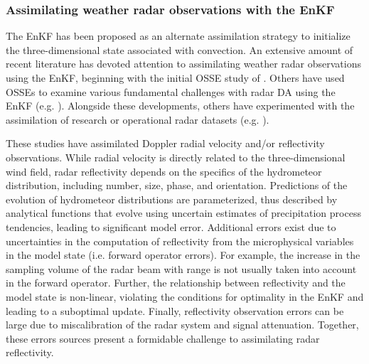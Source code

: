 \subsubsection{Assimilating weather radar observations with the EnKF}
\label{background_radarenkf}
The EnKF has been proposed as an alternate assimilation strategy to initialize the three-dimensional state associated with convection. An extensive amount of recent literature has devoted attention to assimilating weather radar observations using the EnKF, beginning with the initial OSSE study of \citet{snyderzhang03}. Others have used OSSEs to examine various fundamental challenges with radar DA using the EnKF (e.g. \citealt{zhangetal04,tongxue05,cayaetal05,xueetal06,jungetal08a,xuetal08,luxu09,thompsonetal12}). Alongside these developments, others have experimented with the assimilation of research or operational radar datasets (e.g. \citealt{dowelletal04,aksoyetal09,dowellwicker09,dowelletal11,snooketal11,dawsonetal12,jungetal12,tanamachietal13,yussoufetal13}).

These studies have assimilated Doppler radial velocity and/or reflectivity observations. While radial velocity is directly related to the three-dimensional wind field, radar reflectivity depends on the specifics of the hydrometeor distribution, including number, size, phase, and orientation. Predictions of the evolution of hydrometeor distributions are parameterized, thus described by analytical functions that evolve using uncertain estimates of precipitation process tendencies, leading to significant model error. Additional errors exist due to uncertainties in the computation of reflectivity from the microphysical variables in the model state (i.e. forward operator errors). For example, the increase in the sampling volume of the radar beam with range is not usually taken into account in the forward operator. Further, the relationship between reflectivity and the model state is non-linear, violating the conditions for optimality in the EnKF and leading to a suboptimal update. Finally, reflectivity observation errors can be large due to miscalibration of the radar system and signal attenuation. Together, these errors sources present a formidable challenge to assimilating radar reflectivity.

